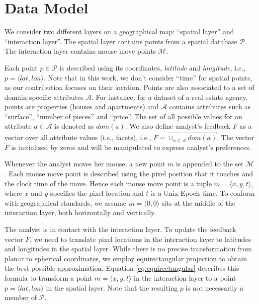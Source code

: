 \documentclass[sigconf,edbt]{acmart-edbt2019}
\begin{document}
\section{Data Model}
\label{sec:datamodel}
We consider two different layers on a geographical map: ``spatial layer'' and ``interaction layer''. The spatial layer contains points from a spatial database $\mathcal{P}$. The interaction layer contains mouse move points $\mathcal{M}$.

\vspace{2pt}
 Each point $p \in \mathcal{P}$ is described using its coordinates, {\em latitude} and {\em longitude}, i.e., $p = \langle \mathit{lat}, \mathit{lon} \rangle$. Note that in this work, we don't consider ``time'' for spatial points, as our contribution focuses on their location. Points are also associated to a set of domain-specific attributes $\mathcal{A}$. For instance, for a dataset of a real estate agency, points are properties (houses and apartments) and $\mathcal{A}$ contains attributes such as ``surface'', ``number of pieces'' and  ``price''. The set of all possible values for an attribute $a \in \mathcal{A}$ is denoted as $dom(a)$. We also define analyst's feedback $F$ as a vector over all attribute values (i.e., facets), i.e., $F = \overrightarrow{\cup_{a \in \mathcal{A}}dom(a)}$. The vector $F$ is initialized by zeros and will be manipulated to express analyst's preferences.

\vspace{2pt}
 Whenever the analyst moves her mouse, a new point $m$ is appended to the set $\mathcal{M}$. Each mouse move point is described using the pixel position that it touches and the clock time of the move. Hence each mouse move point is a tuple $m = \langle x, y, t \rangle$, where $x$ and $y$ specifies the pixel location and $t$ is a Unix Epoch time. To conform with geographical standards, we assume $m = \langle 0, 0\rangle$ sits at the middle of the interaction layer, both horizontally and vertically.

\vspace{2pt}
The analyst is in contact with the interaction layer. To update the feedback vector $F$, we need to translate pixel locations in the interaction layer to latitudes and longitudes in the spatial layer. While there is no precise transformation from planar to spherical coordinates, we employ equirectangular projection to obtain the best possible approximation. Equation \ref{eq:equirectangular} describes this formula to transform a point $m = \langle x,y,t \rangle$ in the interaction layer to a point $p = \langle lat, lon \rangle$ in the spatial layer. Note that the resulting $p$ is not necessarily a member of $\mathcal{P}$. 
\end{document}
